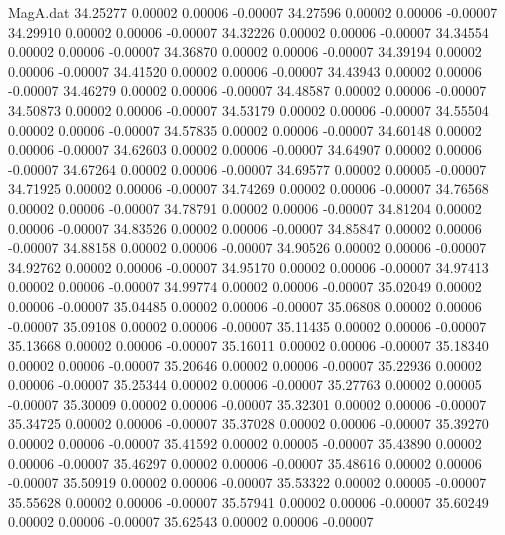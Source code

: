 \begin{filecontents}{MagA.dat}
  34.25277    0.00002    0.00006   -0.00007
  34.27596    0.00002    0.00006   -0.00007
  34.29910    0.00002    0.00006   -0.00007
  34.32226    0.00002    0.00006   -0.00007
  34.34554    0.00002    0.00006   -0.00007
  34.36870    0.00002    0.00006   -0.00007
  34.39194    0.00002    0.00006   -0.00007
  34.41520    0.00002    0.00006   -0.00007
  34.43943    0.00002    0.00006   -0.00007
  34.46279    0.00002    0.00006   -0.00007
  34.48587    0.00002    0.00006   -0.00007
  34.50873    0.00002    0.00006   -0.00007
  34.53179    0.00002    0.00006   -0.00007
  34.55504    0.00002    0.00006   -0.00007
  34.57835    0.00002    0.00006   -0.00007
  34.60148    0.00002    0.00006   -0.00007
  34.62603    0.00002    0.00006   -0.00007
  34.64907    0.00002    0.00006   -0.00007
  34.67264    0.00002    0.00006   -0.00007
  34.69577    0.00002    0.00005   -0.00007
  34.71925    0.00002    0.00006   -0.00007
  34.74269    0.00002    0.00006   -0.00007
  34.76568    0.00002    0.00006   -0.00007
  34.78791    0.00002    0.00006   -0.00007
  34.81204    0.00002    0.00006   -0.00007
  34.83526    0.00002    0.00006   -0.00007
  34.85847    0.00002    0.00006   -0.00007
  34.88158    0.00002    0.00006   -0.00007
  34.90526    0.00002    0.00006   -0.00007
  34.92762    0.00002    0.00006   -0.00007
  34.95170    0.00002    0.00006   -0.00007
  34.97413    0.00002    0.00006   -0.00007
  34.99774    0.00002    0.00006   -0.00007
  35.02049    0.00002    0.00006   -0.00007
  35.04485    0.00002    0.00006   -0.00007
  35.06808    0.00002    0.00006   -0.00007
  35.09108    0.00002    0.00006   -0.00007
  35.11435    0.00002    0.00006   -0.00007
  35.13668    0.00002    0.00006   -0.00007
  35.16011    0.00002    0.00006   -0.00007
  35.18340    0.00002    0.00006   -0.00007
  35.20646    0.00002    0.00006   -0.00007
  35.22936    0.00002    0.00006   -0.00007
  35.25344    0.00002    0.00006   -0.00007
  35.27763    0.00002    0.00005   -0.00007
  35.30009    0.00002    0.00006   -0.00007
  35.32301    0.00002    0.00006   -0.00007
  35.34725    0.00002    0.00006   -0.00007
  35.37028    0.00002    0.00006   -0.00007
  35.39270    0.00002    0.00006   -0.00007
  35.41592    0.00002    0.00005   -0.00007
  35.43890    0.00002    0.00006   -0.00007
  35.46297    0.00002    0.00006   -0.00007
  35.48616    0.00002    0.00006   -0.00007
  35.50919    0.00002    0.00006   -0.00007
  35.53322    0.00002    0.00005   -0.00007
  35.55628    0.00002    0.00006   -0.00007
  35.57941    0.00002    0.00006   -0.00007
  35.60249    0.00002    0.00006   -0.00007
  35.62543    0.00002    0.00006   -0.00007

\end{filecontents}
